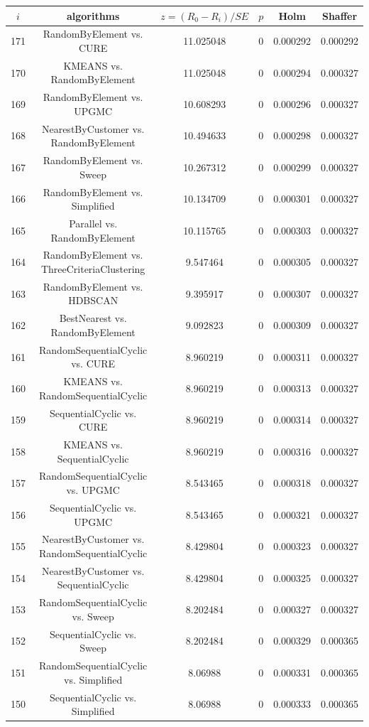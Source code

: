 \documentclass[a4paper,10pt]{article}
\begin{document}
\begin{landscape}
\begin{table}[!htp]
\centering\scriptsize
\begin{tabular}{cccccc}
$i$&algorithms&$z=(R_0 - R_i)/SE$&$p$&Holm&Shaffer\\
\hline171&RandomByElement vs. CURE&11.025048&0&0.000292&0.000292\\
170&KMEANS vs. RandomByElement&11.025048&0&0.000294&0.000327\\
169&RandomByElement vs. UPGMC&10.608293&0&0.000296&0.000327\\
168&NearestByCustomer vs. RandomByElement&10.494633&0&0.000298&0.000327\\
167&RandomByElement vs. Sweep&10.267312&0&0.000299&0.000327\\
166&RandomByElement vs. Simplified&10.134709&0&0.000301&0.000327\\
165&Parallel vs. RandomByElement&10.115765&0&0.000303&0.000327\\
164&RandomByElement vs. ThreeCriteriaClustering&9.547464&0&0.000305&0.000327\\
163&RandomByElement vs. HDBSCAN&9.395917&0&0.000307&0.000327\\
162&BestNearest vs. RandomByElement&9.092823&0&0.000309&0.000327\\
161&RandomSequentialCyclic vs. CURE&8.960219&0&0.000311&0.000327\\
160&KMEANS vs. RandomSequentialCyclic&8.960219&0&0.000313&0.000327\\
159&SequentialCyclic vs. CURE&8.960219&0&0.000314&0.000327\\
158&KMEANS vs. SequentialCyclic&8.960219&0&0.000316&0.000327\\
157&RandomSequentialCyclic vs. UPGMC&8.543465&0&0.000318&0.000327\\
156&SequentialCyclic vs. UPGMC&8.543465&0&0.000321&0.000327\\
155&NearestByCustomer vs. RandomSequentialCyclic&8.429804&0&0.000323&0.000327\\
154&NearestByCustomer vs. SequentialCyclic&8.429804&0&0.000325&0.000327\\
153&RandomSequentialCyclic vs. Sweep&8.202484&0&0.000327&0.000327\\
152&SequentialCyclic vs. Sweep&8.202484&0&0.000329&0.000365\\
151&RandomSequentialCyclic vs. Simplified&8.06988&0&0.000331&0.000365\\
150&SequentialCyclic vs. Simplified&8.06988&0&0.000333&0.000365\\

\end{tabular}
\end{table}
\end{landscape}
\end{document}
